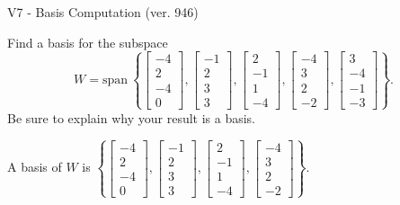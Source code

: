 \begin{exercise}
  \begin{exerciseTitle}V7 - Basis Computation (ver. 946)\end{exerciseTitle}
  \begin{exerciseStatement}
    Find a basis for the subspace 
\[W=\mathrm{span}\ \left\{\left[\begin{array}{r}
-4 \\
2 \\
-4 \\
0
\end{array}\right] , \left[\begin{array}{r}
-1 \\
2 \\
3 \\
3
\end{array}\right] , \left[\begin{array}{r}
2 \\
-1 \\
1 \\
-4
\end{array}\right] , \left[\begin{array}{r}
-4 \\
3 \\
2 \\
-2
\end{array}\right] , \left[\begin{array}{r}
3 \\
-4 \\
-1 \\
-3
\end{array}\right]\right\}.\]
 Be sure to explain why your result is a basis.


  \end{exerciseStatement}
  \begin{exerciseAnswer}
   A basis of \(W\) is  \(\left\{\left[\begin{array}{r}
-4 \\
2 \\
-4 \\
0
\end{array}\right] , \left[\begin{array}{r}
-1 \\
2 \\
3 \\
3
\end{array}\right] , \left[\begin{array}{r}
2 \\
-1 \\
1 \\
-4
\end{array}\right] , \left[\begin{array}{r}
-4 \\
3 \\
2 \\
-2
\end{array}\right]\right\}\).
  


  \end{exerciseAnswer}
\end{exercise}